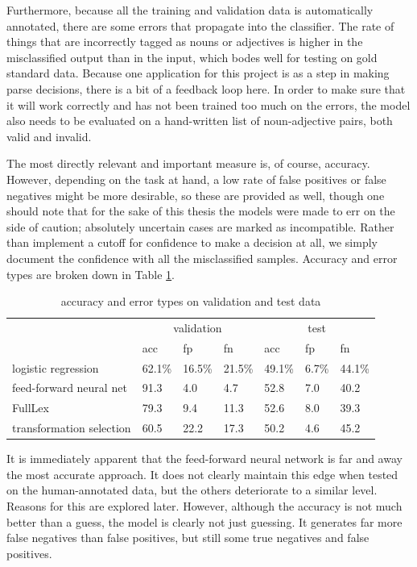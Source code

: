 \documentclass[a4paper, 12pt]{article}
\begin{document}
Furthermore, because all the training and validation data is automatically annotated, there are some errors that propagate into the classifier. The rate of things that are incorrectly tagged as nouns or adjectives is higher in the misclassified output than in the input, which bodes well for testing on gold standard data. Because one application for this project is as a step in making parse decisions, there is a bit of a feedback loop here. In order to make sure that it will work correctly and has not been trained too much on the errors, the model also needs to be evaluated on a hand-written list of noun-adjective pairs, both valid and invalid.

The most directly relevant and important measure is, of course, accuracy. However, depending on the task at hand, a low rate of false positives or false negatives might be more desirable, so these are provided as well, though one should note that for the sake of this thesis the models were made to err on the side of caution; absolutely uncertain cases are marked as incompatible. Rather than implement a cutoff for confidence to make a decision at all, we simply document the confidence with all the misclassified samples. Accuracy and error types are broken down in Table \ref{accuracy-an}.

\begin{table}[]
	\centering
	\begin{tabular}{l|lll|lll}
		                         & \multicolumn{3}{c|}{validation} & \multicolumn{3}{c}{test}  \\
		                         & acc      & fp       & fn        & acc     & fp     & fn     \\ \hline
		logistic regression      & 62.1\%   & 16.5\%   & 21.5\%    & 49.1\%  & 6.7\%  & 44.1\% \\
		feed-forward neural net  & 91.3     & 4.0      & 4.7       & 52.8    & 7.0    & 40.2   \\
		FullLex                  & 79.3     & 9.4      & 11.3      & 52.6    & 8.0    & 39.3   \\
		transformation selection & 60.5     & 22.2     & 17.3      & 50.2    & 4.6    & 45.2
	\end{tabular}
	\caption{accuracy and error types on validation and test data}
	\label{accuracy-an}
\end{table}

It is immediately apparent that the feed-forward neural network is far and away the most accurate approach. It does not clearly maintain this edge when tested on the human-annotated data, but the others deteriorate to a similar level. Reasons for this are explored later. However, although the accuracy is not much better than a guess, the model is clearly not just guessing. It generates far more false negatives than false positives, but still some true negatives and false positives.
\end{document}
